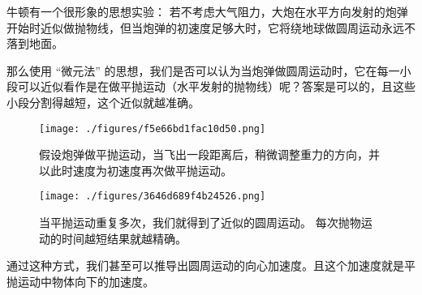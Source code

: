 
牛顿有一个很形象的思想实验： 若不考虑大气阻力，大炮在水平方向发射的炮弹开始时近似做抛物线，但当炮弹的初速度足够大时，它将绕地球做圆周运动永远不落到地面。

那么使用 “微元法” 的思想，我们是否可以认为当炮弹做圆周运动时，它在每一小段可以近似看作是在做平抛运动（水平发射的抛物线）呢？答案是可以的，且这些小段分割得越短，这个近似就越准确。

\begin{figure}[ht]
\centering
\texttt{[image: ./figures/f5e66bd1fac10d50.png]}
\caption{假设炮弹做平抛运动，当飞出一段距离后，稍微调整重力的方向，并以此时速度为初速度再次做平抛运动。} \label{fig_CMintr_1}
\end{figure}

\begin{figure}[ht]
\centering
\texttt{[image: ./figures/3646d689f4b24526.png]}
\caption{当平抛运动重复多次，我们就得到了近似的圆周运动。 每次抛物运动的时间越短结果就越精确。} \label{fig_CMintr_2}
\end{figure}

通过这种方式，我们甚至可以推导出圆周运动的向心加速度。且这个加速度就是平抛运动中物体向下的加速度。
